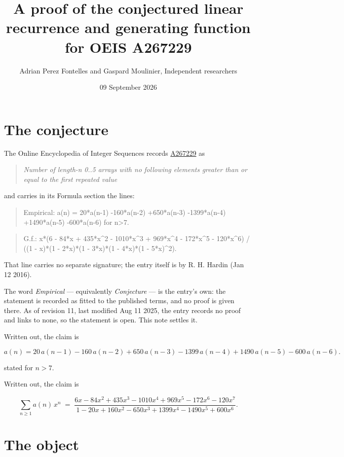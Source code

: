\documentclass[11pt]{article}
\title{A proof of the conjectured linear recurrence and generating function for OEIS A267229}
\author{Adrian Perez Fontelles and Gaspard Moulinier, Independent researchers}
\date{09 September 2026}
\theoremstyle{definition}
\begin{document}
\maketitle
\section{The conjecture}

The Online Encyclopedia of Integer Sequences records \href{https://oeis.org/A267229}{A267229} as

\begin{quote}\itshape Number of length-n 0..5 arrays with no following elements greater than or equal to the first repeated value\end{quote}

and carries in its Formula section the lines:

\begin{quote}\ttfamily Empirical: a(n) = 20*a(n-1) -160*a(n-2) +650*a(n-3) -1399*a(n-4) +1490*a(n-5) -600*a(n-6) for n>7.\end{quote}

\begin{quote}\ttfamily G.f.: x*(6 - 84*x + 435*x\textasciicircum{}2 - 1010*x\textasciicircum{}3 + 969*x\textasciicircum{}4 - 172*x\textasciicircum{}5 - 120*x\textasciicircum{}6) / ((1 - x)*(1 - 2*x)*(1 - 3*x)*(1 - 4*x)*(1 - 5*x)\textasciicircum{}2).\end{quote}

That line carries no separate signature; the entry itself is by R. H. Hardin (Jan 12 2016).

The word {\itshape Empirical} --- equivalently {\itshape Conjecture} --- is the entry's own: the statement is recorded as fitted to the published terms, and no proof is given there. As of revision 11, last modified Aug 11 2025, the entry records no proof and links to none, so the statement is open. This note settles it.

Written out, the claim is

\[a(n) = 20\,a(n-1) - 160\,a(n-2) + 650\,a(n-3) - 1399\,a(n-4) + 1490\,a(n-5) - 600\,a(n-6).\]

stated for $n > 7$.

Written out, the claim is

\[\sum_{n \ge 1} a(n)\,x^n \;=\; \frac{6x - 84x^{2} + 435x^{3} - 1010x^{4} + 969x^{5} - 172x^{6} - 120x^{7}}{1 - 20x + 160x^{2} - 650x^{3} + 1399x^{4} - 1490x^{5} + 600x^{6}}.\]

\section{The object}
\end{document}
